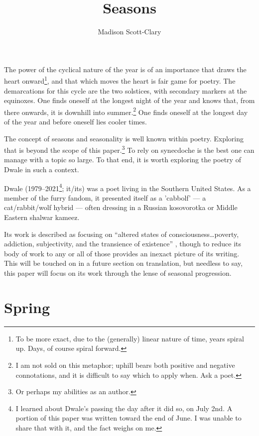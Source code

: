 \documentclass{memoir}
\title{Seasons}
\author{Madison Scott-Clary}
\begin{document}
The power of the cyclical nature of the year is of an importance that draws the heart onward\footnote{To be more exact, due to the (generally) linear nature of time, years spiral up. Days, of course spiral forward.}, and that which moves the heart is fair game for poetry. The demarcations for this cycle are the two solstices, with secondary markers at the equinoxes. One finds oneself at the longest night of the year and knows that, from there onwards, it is downhill into summer.\footnote{I am not sold on this metaphor; uphill bears both positive and negative connotations, and it is difficult to say which to apply when. Ask a poet.} One finds oneself at the longest day of the year and before oneself lies cooler times.

The concept of seasons and seasonality is well known within poetry. Exploring that is beyond the scope of this paper.\footnote{Or perhaps my abilities as an author.} To rely on synecdoche is the best one can manage with a topic so large. To that end, it is worth exploring the poetry of Dwale in such a context.

Dwale (1979--2021\footnote{I learned about Dwale's passing the day after it did so, on July 2nd. A portion of this paper was written toward the end of June. I was unable to share that with it, and the fact weighs on me.}; it/its) was a poet living in the Southern United States. As a member of the furry fandom, it presented itself as a 'cabbolf' --- a cat/rabbit/wolf hybrid --- often dressing in a Russian kosovorotka or Middle Eastern shalwar kameez. \parencite{dwale}

Its work is described as focusing on ``altered states of consciousness\ldots{}poverty, addiction, subjectivity, and the transience of existence'' \parencite{dwale}, though to reduce its body of work to any or all of those provides an inexact picture of its writing. This will be touched on in a future section on translation, but needless to say, this paper will focus on its work through the lense of seasonal progression.

\newpage

\section*{Spring}
\end{document}
